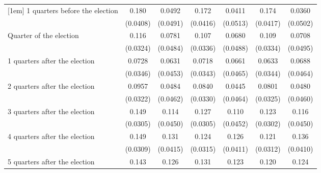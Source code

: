 \begin{table}[htbp]
\begin{tabular}{l*{6}{c}}
[1em]
 1 quarters before the election&       0.180\sym{***}&      0.0492         &       0.172\sym{***}&      0.0411         &       0.174\sym{***}&      0.0360         \\
                    &    (0.0408)         &    (0.0491)         &    (0.0416)         &    (0.0513)         &    (0.0417)         &    (0.0502)         \\
[1em]
Quarter of the election&       0.116\sym{***}&      0.0781         &       0.107\sym{**} &      0.0680         &       0.109\sym{**} &      0.0708         \\
                    &    (0.0324)         &    (0.0484)         &    (0.0336)         &    (0.0488)         &    (0.0334)         &    (0.0495)         \\
[1em]
 1 quarters after the election&      0.0728\sym{*}  &      0.0631         &      0.0718\sym{*}  &      0.0661         &      0.0633         &      0.0688         \\
                    &    (0.0346)         &    (0.0453)         &    (0.0343)         &    (0.0465)         &    (0.0344)         &    (0.0464)         \\
[1em]
 2 quarters after the election&      0.0957\sym{**} &      0.0484         &      0.0840\sym{*}  &      0.0445         &      0.0801\sym{*}  &      0.0480         \\
                    &    (0.0322)         &    (0.0462)         &    (0.0330)         &    (0.0464)         &    (0.0325)         &    (0.0460)         \\
[1em]
 3 quarters after the election&       0.149\sym{***}&       0.114\sym{*}  &       0.127\sym{***}&       0.110\sym{*}  &       0.123\sym{***}&       0.116\sym{*}  \\
                    &    (0.0305)         &    (0.0450)         &    (0.0305)         &    (0.0452)         &    (0.0302)         &    (0.0450)         \\
[1em]
 4 quarters after the election&       0.149\sym{***}&       0.131\sym{**} &       0.124\sym{***}&       0.126\sym{**} &       0.121\sym{***}&       0.136\sym{***}\\
                    &    (0.0309)         &    (0.0415)         &    (0.0315)         &    (0.0411)         &    (0.0312)         &    (0.0410)         \\
[1em]
 5 quarters after the election&       0.143\sym{***}&       0.126\sym{**} &       0.131\sym{***}&       0.123\sym{**} &       0.120\sym{***}&       0.124\sym{**} \\

\end{tabular}
\end{table}
